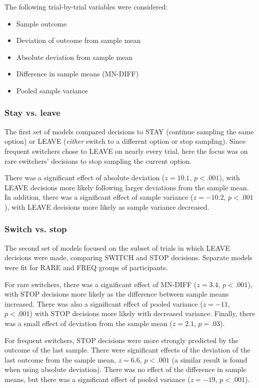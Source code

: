 \documentclass[english,doc]{apa}
\begin{document}
The following trial-by-trial variables were considered:

\begin{itemize}
\item Sample outcome
\item Deviation of outcome from sample mean
\item Absolute deviation from sample mean
\item Difference in sample means (MN-DIFF)
\item Pooled sample variance
\end{itemize}


\subsubsection{Stay vs. leave}

The first set of models compared decisions to STAY (continue sampling the same option) or LEAVE (\emph{either} switch to a different option or stop sampling). 
Since frequent switchers chose to LEAVE on nearly every trial, here the focus was on rare switchers' decisions to stop sampling the current option.

There was a significant effect of absolute deviation ($z=10.1$, $p < .001$), with LEAVE decisions more likely following larger deviations from the sample mean.
In addition, there was a significant effect of sample variance ($z=-10.2$, $p<.001$), with LEAVE decisions more likely as sample variance decreased.


\subsubsection{Switch vs. stop}

The second set of models focused on the subset of trials in which LEAVE decisions were made, comparing SWITCH and STOP decisions.
Separate models were fit for RARE and FREQ groups of participants.

For rare switchers, there was a significant effect of MN-DIFF ($z=3.4$, $p<.001$), with STOP decisions more likely as the difference between sample means increased.
There was also a significant effect of pooled variance ($z=-11$, $p<.001$) with STOP decisions more likely with decreased variance.
Finally, there was a small effect of deviation from the sample mean ($z=2.1$, $p=.03$).

For frequent switchers, STOP decisions were more strongly predicted by the outcome of the last sample.
There were significant effects of the deviation of the last outcome from the sample mean, $z=6.6$, $p<.001$ (a similar result is found when using absolute deviation).
There was no effect of the difference in sample means, but there was a significant effect of pooled variance ($z=-19$, $p<.001$).
\end{document}
